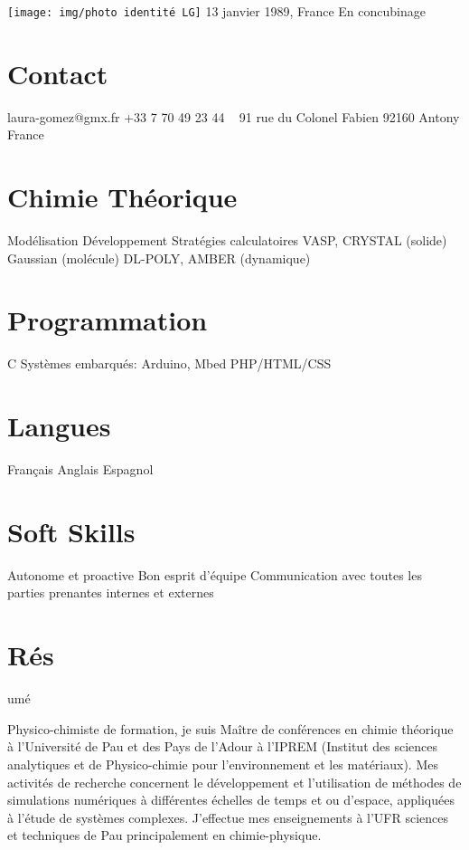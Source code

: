 \documentclass{cv-style}     %
\begin{document}


\begin{aside}
    \texttt{[image: img/photo identité LG]}
    13 janvier 1989, France
    En concubinage
    \section{Contact}
    laura-gomez@gmx.fr
    +33 7 70 49 23 44
    ~
    91 rue du Colonel Fabien
    92160 Antony
    France
    \section{Chimie Théorique}
    Modélisation
    Développement
    Stratégies calculatoires
    VASP, CRYSTAL (solide)
    Gaussian (molécule)
    DL-POLY, AMBER (dynamique)
    \section{Programmation}
    C
    Systèmes embarqués: Arduino, Mbed
    PHP/HTML/CSS
    \section{Langues}
    Français 
    Anglais 
    Espagnol
    \section{Soft Skills}
    Autonome et proactive
    Bon esprit d'équipe
    Communication avec toutes les parties prenantes
      internes et externes
\end{aside}

\section{Rés}{umé}

Physico-chimiste de formation, je suis Maître de conférences en chimie théorique
 à l'Université de Pau et des Pays de l'Adour à l'IPREM (Institut des sciences
 analytiques et de Physico-chimie pour l'environnement et les matériaux). Mes activités de
recherche concernent le développement et l'utilisation de méthodes de simulations
numériques à
différentes échelles de temps et ou d'espace, appliquées
à l'étude de systèmes complexes. J'effectue mes enseignements à l'UFR sciences et
techniques de Pau principalement en chimie-physique.
\end{document}
